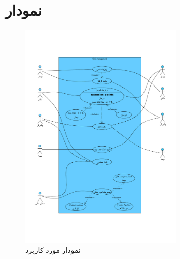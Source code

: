 \documentclass[a4paper,12pt]{article}
\begin{document}
	\section{
		نمودار 
		}\label{sec8}
	\begin{figure}[!h]
		\label{fig1:sec8}
		\begin{center}
			\includegraphics[width=0.7\textwidth]{useCase.pdf}
			\caption{نمودار مورد کاربرد}
		\end{center}
	\end{figure}
\end{document}
